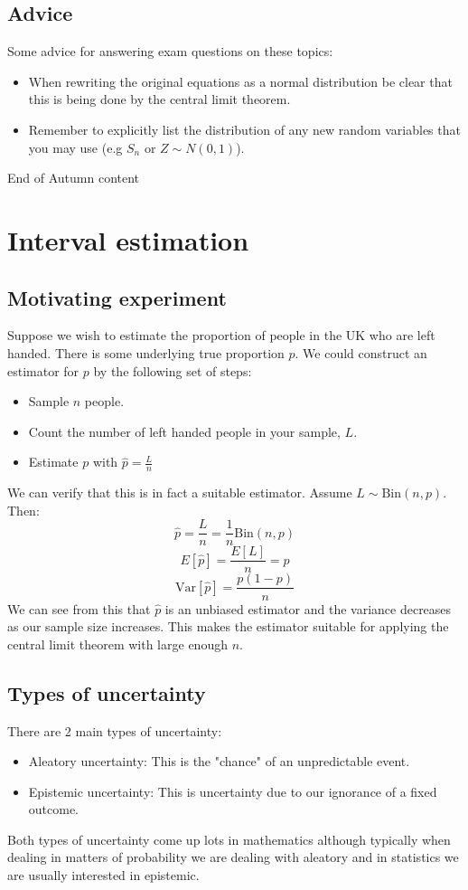 \documentclass[12pt]{article}
\newcommand{\Var}[1]{\text{Var}[#1]}
\begin{document}
\subsection*{Advice}
Some advice for answering exam questions on these topics:
\begin{itemize}
\item When rewriting the original equations as a normal distribution be clear that this is being done by the central limit theorem.
\item Remember to explicitly list the distribution of any new random variables that you may use (e.g \(S_n\) or \(Z\sim N(0,1)\)).
\end{itemize}

\hrulefill
\begin{center}
End of Autumn content
\end{center}
\hrulefill
\section{Interval estimation}
\subsection*{Motivating experiment}
Suppose we wish to estimate the proportion of people in the UK who are left handed. There is some underlying true proportion \(p\). We could construct an estimator for \(p\) by the following set of steps:
\begin{itemize}
    \item Sample \(n\) people.
    \item Count the number of left handed people in your sample, \(L\).
    \item Estimate \(p\) with \(\hat{p}=\frac{L}{n}\)
\end{itemize}
We can verify that this is in fact a suitable estimator. Assume \(L\sim \text{Bin}(n,p)\). Then:
\[\hat{p}=\frac{L}{n}=\frac{1}{n}\text{Bin}(n,p)\]
\[E[\hat{p}]=\frac{E[L]}{n}=p\]
\[\Var{\hat{p}}=\frac{p(1-p)}{n}\]
We can see from this that \(\hat{p}\) is an unbiased estimator and the variance decreases as our sample size increases. This makes the estimator suitable for applying the central limit theorem with large enough \(n\).
\subsection*{Types of uncertainty}
There are 2 main types of uncertainty:
\begin{itemize}
    \item Aleatory uncertainty: This is the "chance" of an unpredictable event.
    \item Epistemic uncertainty: This is uncertainty due to our ignorance of a fixed outcome.
\end{itemize}
Both types of uncertainty come up lots in mathematics although typically when dealing in matters of probability we are dealing with aleatory and in statistics we are usually interested in epistemic.
\end{document}
